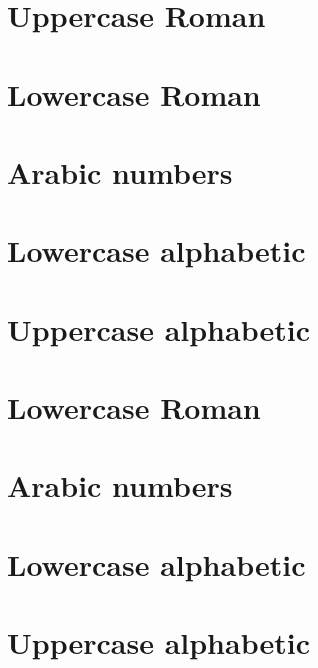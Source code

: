 \documentclass{article}
\begin{document}
\tableofcontents
\newpage
\section{Uppercase Roman}
\blindtext[1]
\newpage
\section{Lowercase Roman} %
\blindtext[1]
\newpage
\section{Arabic numbers}
\blindtext[1]
\newpage
\section{Lowercase alphabetic}
\blindtext[1]
\newpage
\section{Uppercase alphabetic}
\blindtext[5]

\section{Lowercase Roman} %
\blindtext[1]
\newpage
\section{Arabic numbers}
\blindtext[1]
\newpage
\section{Lowercase alphabetic}
\blindtext[10]
\newpage
\section{Uppercase alphabetic}
\blindtext[3]
\end{document}

